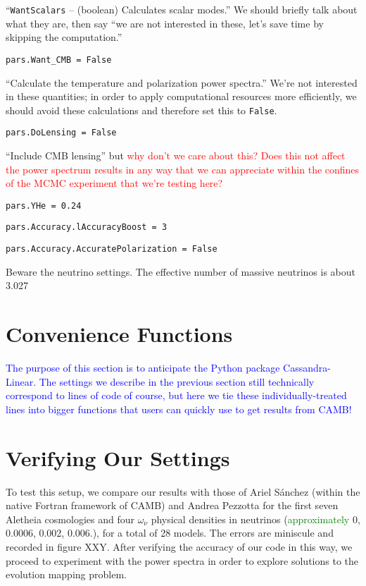 ``\verb|WantScalars| – (boolean) Calculates scalar modes.'' We should briefly 
talk about what they are, then say ``we are not interested in these, let's 
save time by skipping the computation.''

\verb|pars.Want_CMB = False|

``Calculate the temperature and polarization power spectra.'' We're not 
interested in these quantities; in order to apply computational resources more 
efficiently, we should avoid these calculations and therefore set this to 
\verb|False|.

\verb|pars.DoLensing = False|

``Include CMB lensing'' but \textcolor{red}{why don't we care about this? Does
this not affect the power spectrum results in any way that we can appreciate
within the confines of the MCMC experiment that we're testing here?}

\verb|pars.YHe = 0.24|

\verb|pars.Accuracy.lAccuracyBoost = 3|

\verb|pars.Accuracy.AccuratePolarization = False|


Beware the neutrino settings. The effective number of massive neutrinos is about 3.027

\section{Convenience Functions}


\textcolor{blue}{The purpose of this section is to anticipate the Python
package Cassandra-Linear. The settings we describe in the previous section
still technically correspond to lines of code of course, but here we tie these
individually-treated lines into bigger functions that users can quickly use to
get results from CAMB!}

\section{Verifying Our Settings}


To test this setup, we compare our results with those of Ariel S\'{a}nchez 
(within the native Fortran framework of CAMB) and Andrea Pezzotta for the
first seven Aletheia cosmologies and four $\omega_\nu$ physical densities in
neutrinos (\textcolor{green}{approximately} 0, 0.0006, 0.002, 0.006.), for a 
total of 28
models. The errors are miniscule and recorded in figure XXY. After verifying
the accuracy of our code in this way, we proceed to experiment with the power
spectra in order to explore solutions to the evolution mapping problem.


